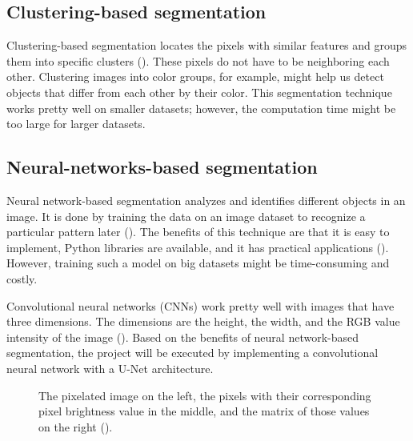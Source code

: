\documentclass[english]{sbrt}
\begin{document}
\subsection{Clustering-based segmentation}
Clustering-based segmentation locates the pixels with similar features and groups them into specific clusters (\cite{sharma_2020_clusterbased}). These pixels do not have to be neighboring each other. Clustering images into color groups, for example, might help us detect objects that differ from each other by their color. This segmentation technique works pretty well on smaller datasets; however, the computation time might be too large for larger datasets.

\subsection{Neural-networks-based segmentation}
Neural network-based segmentation analyzes and identifies different objects in an image. It is done by training the data on an image dataset to recognize a particular pattern later (\cite{sharif_2010_artificial}). The benefits of this technique are that it is easy to implement, Python libraries are available, and it has practical applications (\cite{prasad_2020_what}). However, training such a model on big datasets might be time-consuming and costly.

\noindent Convolutional neural networks (CNNs) work pretty well with images that have three dimensions. The dimensions are the height, the width, and the RGB value intensity of the image (\cite{kaushik_2019_image}). Based on the benefits of neural network-based segmentation, the project will be executed by implementing a convolutional neural network with a U-Net architecture. 


\begin{figure}[H]
\centering 
{}
\caption{\label{fig:fig2} The pixelated image on the left, the pixels with their corresponding pixel brightness value in the middle, and the matrix of those values on the right (\cite{yamashita_2018_convolutional}).}
\end{figure}
\end{document}
